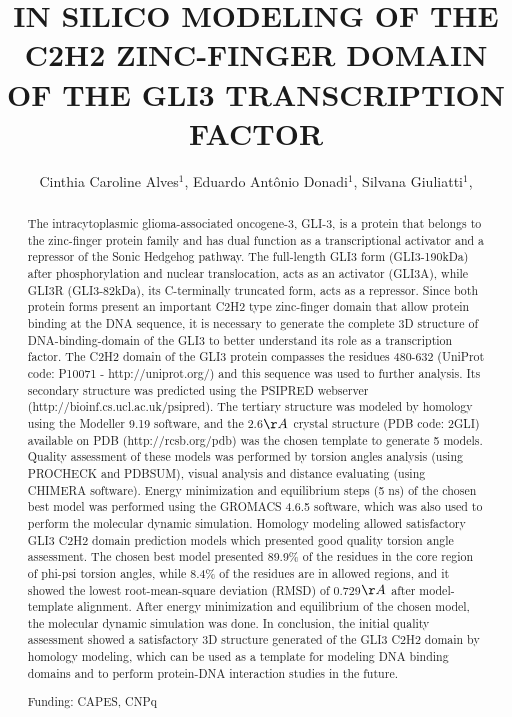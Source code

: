 \documentclass[twoside]{article}
\title{\vspace{-15mm}\fontsize{24pt}{10pt}\selectfont\textbf{ IN SILICO MODELING OF THE C2H2 ZINC-FINGER DOMAIN OF THE GLI3 TRANSCRIPTION FACTOR }} %
\author{ Cinthia Caroline Alves$^{1}$, Eduardo Antônio Donadi$^{1}$, Silvana Giuliatti$^{1}$, }
\affil{ 1 Ribeirão Preto Medical School University of São Paulo

 }
\date{}
\begin{document}
  
  
  \maketitle %
  
  
  \thispagestyle{fancy} %
  
  
  \begin{abstract}
  The intracytoplasmic glioma-associated oncogene-3, GLI-3, is a protein that belongs to the zinc-finger protein family and has dual function as a transcriptional activator and a repressor of the Sonic Hedgehog pathway. The full-length GLI3 form (GLI3-190kDa) after phosphorylation and nuclear translocation, acts as an activator (GLI3A), while GLI3R (GLI3-82kDa), its C-terminally truncated form, acts as a repressor. Since both protein forms present an important C2H2 type zinc-finger domain that allow protein binding at the DNA sequence, it is necessary to generate the complete 3D structure of DNA-binding-domain of the GLI3 to better understand its role as a transcription factor. The C2H2 domain of the GLI3 protein compasses the residues 480-632 (UniProt code: P10071 - http://uniprot.org/) and this sequence was used to further analysis. Its secondary structure was predicted using the PSIPRED webserver (http://bioinf.cs.ucl.ac.uk/psipred). The tertiary structure was modeled by homology using the Modeller 9.19 software, and the 2.6$\AA$ crystal structure (PDB code: 2GLI) available on PDB (http://rcsb.org/pdb) was the chosen template to generate 5 models. Quality assessment of these models was performed by torsion angles analysis (using PROCHECK and PDBSUM), visual analysis and distance evaluating (using CHIMERA software). Energy minimization and equilibrium steps (5 ns) of the chosen best model was performed using the GROMACS 4.6.5 software, which was also used to perform the molecular dynamic simulation. Homology modeling allowed satisfactory GLI3 C2H2 domain prediction models which presented good quality torsion angle assessment. The chosen best model presented 89.9\% of the residues in the core region of phi-psi torsion angles, while 8.4\% of the residues are in allowed regions, and it showed the lowest root-mean-square deviation (RMSD) of 0.729$\AA$ after model-template alignment. After energy minimization and equilibrium of the chosen model, the molecular dynamic simulation was done. In conclusion, the initial quality assessment showed a satisfactory 3D structure generated of the GLI3 C2H2 domain by homology modeling, which can be used as a template for modeling DNA binding domains and to perform protein-DNA interaction studies in the future.
  
  Funding: CAPES, CNPq \\ 
  \end{abstract}
  
\end{document}
